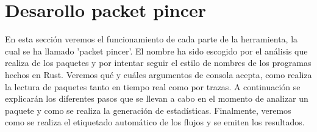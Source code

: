 \section{Desarollo packet pincer}

En esta sección veremos el funcionamiento de cada parte de la herramienta, la cual se ha llamado 'packet pincer'. El nombre ha sido escogido por el análisis que realiza de los paquetes y por intentar seguir el estilo de nombres de los programas hechos en Rust. Veremos qué y cuáles argumentos de consola acepta, como realiza la lectura de paquetes tanto en tiempo real como por trazas. A continuación se explicarán los diferentes pasos que se llevan a cabo en el momento de analizar un paquete y como se realiza la generación de estadísticas. Finalmente, veremos como se realiza el etiquetado automático de los flujos y se emiten los resultados.

